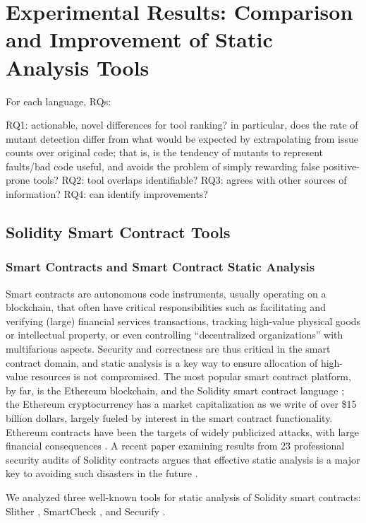 \section{Experimental Results: Comparison and Improvement of Static Analysis Tools}

For each language, RQs:

RQ1:  actionable, novel differences for tool ranking?  in particular, does the rate of mutant detection differ from what would be expected by extrapolating from issue counts over original code; that is, is the tendency of mutants to represent faults/bad code useful, and avoids the problem of simply rewarding false positive-prone tools?
RQ2:  tool overlaps identifiable?
RQ3:  agrees with other sources of information?
RQ4:  can identify improvements?

\subsection{Solidity Smart Contract Tools}

\subsubsection{Smart Contracts and Smart Contract Static Analysis}

Smart contracts are autonomous code instruments, usually operating on a blockchain, that often have critical responsibilities such as facilitating and verifying (large) financial services transactions, tracking high-value physical goods or intellectual property, or even controlling ``decentralized organizations'' with multifarious aspects.  Security and correctness are thus critical in the smart contract domain, and static analysis is a key way to ensure allocation of high-value resources is not compromised.  The most popular smart contract platform, by far, is the Ethereum blockchain, and the Solidity smart contract language \cite{buterin2013whitepaper,wood2014yellow}; the Ethereum cryptocurrency has a market capitalization as we write of over \$15 billion dollars, largely fueled by interest in the smart contract functionality.  Ethereum contracts have been the targets of widely publicized attacks, with large financial consequences  \cite{spank,DAO}.   A recent paper examining results from 23 professional security audits of Solidity contracts argues that effective static analysis is a major key to avoiding such disasters in the future \cite{FC20}.

We analyzed three well-known tools for static analysis of Solidity smart contracts: Slither \cite{slither}, SmartCheck \cite{smartcheck}, and Securify \cite{Securify}.

